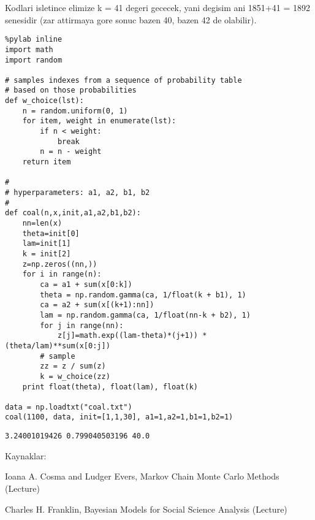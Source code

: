 \documentclass[12pt,fleqn]{article}\usepackage{../common}
\begin{document}
Kodlari isletince elimize k = 41 degeri gececek, yani degisim ani
1851+41 = 1892 senesidir (zar attirmaya gore sonuc bazen 40, bazen 42
de olabilir).

\begin{verbatim}
%pylab inline
import math
import random

# samples indexes from a sequence of probability table
# based on those probabilities
def w_choice(lst):
    n = random.uniform(0, 1)
    for item, weight in enumerate(lst):
        if n < weight:
            break
        n = n - weight
    return item

#
# hyperparameters: a1, a2, b1, b2
#
def coal(n,x,init,a1,a2,b1,b2):
    nn=len(x)
    theta=init[0]
    lam=init[1]
    k = init[2]
    z=np.zeros((nn,))
    for i in range(n):
        ca = a1 + sum(x[0:k])
        theta = np.random.gamma(ca, 1/float(k + b1), 1) 
        ca = a2 + sum(x[(k+1):nn])
        lam = np.random.gamma(ca, 1/float(nn-k + b2), 1)
        for j in range(nn):
            z[j]=math.exp((lam-theta)*(j+1)) * (theta/lam)**sum(x[0:j])
        # sample
        zz = z / sum(z)
        k = w_choice(zz)
    print float(theta), float(lam), float(k)
                
data = np.loadtxt("coal.txt")
coal(1100, data, init=[1,1,30], a1=1,a2=1,b1=1,b2=1)
\end{verbatim}

\begin{verbatim}
3.24001019426 0.799040503196 40.0
\end{verbatim}

Kaynaklar: 

Ioana A. Cosma and Ludger Evers, Markov Chain Monte Carlo Methods (Lecture) 

Charles H. Franklin, Bayesian Models for Social Science Analysis (Lecture)
\end{document}
